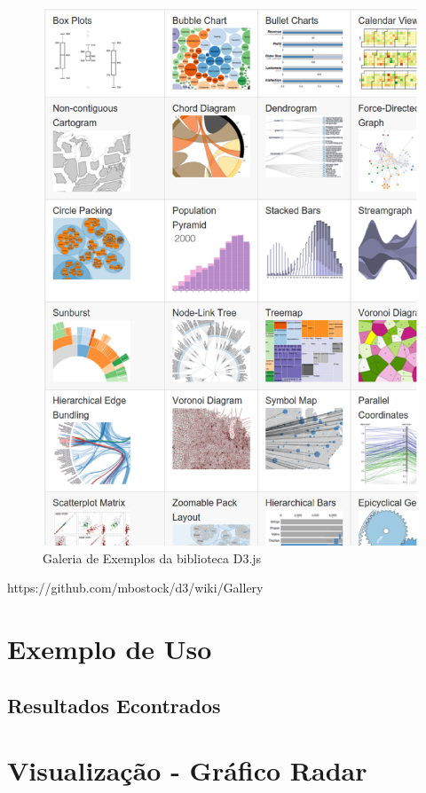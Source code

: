 \begin{figure}[!htb]
	\centering
    \includegraphics[keepaspectratio=true,scale=0.5]
    {figuras/d3_gallery.eps}
  \caption{Galeria de Exemplos da biblioteca D3.js \cite{galleryD3}}
  \label{fig:d3_gallery}
\end{figure}

https://github.com/mbostock/d3/wiki/Gallery

\section{Exemplo de Uso}


\subsection{Resultados Econtrados}

\section{Visualização - Gráfico Radar}
